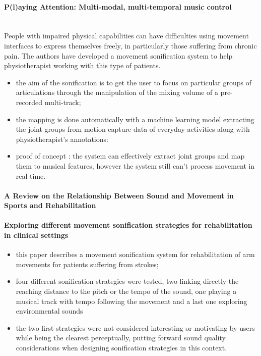 \documentclass[11pt]{article}
\begin{document}
\paragraph{P(l)aying Attention: Multi-modal, multi-temporal music control} \citep{gold_playing_2020} \\
People with impaired physical capabilities can have difficulties using movement interfaces to express themselves freely, in particularly those suffering from chronic pain. The authors have developed a movement sonification system to help physiotherapist working with this type of patients.
\begin{itemize}
    \item the aim of the sonification is to get the user to focus on particular groups of articulations through the manipulation of the mixing volume of a pre-recorded multi-track;
    \item the mapping is done automatically with a machine learning model extracting the joint groups from motion capture data of everyday activities along with physiotherapist's annotations: 
    \item proof of concept : the system can effectively extract joint groups and map them to musical features, however the system still can't process movement in real-time.
\end{itemize}

\paragraph{A Review on the Relationship Between Sound and Movement in Sports and Rehabilitation} \citep{schaffert_review_2019}

\paragraph{Exploring different movement sonification strategies for rehabilitation in clinical settings} \citep{bevilacqua_exploring_2018}
\begin{itemize}
    \item this paper describes a movement sonification system for rehabilitation of arm movements for patients suffering from strokes;
    \item four different sonification strategies were tested, two linking directly the reaching distance to the pitch or the tempo of the sound, one playing a musical track with tempo following the movement and a last one exploring environmental sounds
    \item the two first strategies were not considered interesting or motivating by users while being the clearest perceptually, putting forward sound quality considerations when designing sonification strategies in this context.
\end{itemize}
\end{document}
